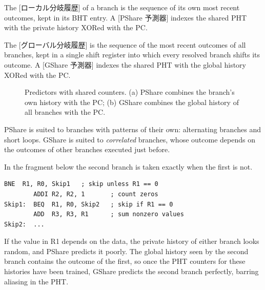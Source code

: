 \documentclass[../main.tex]{subfiles}
\begin{document}
\begin{definition}[PShare]
  The [ローカル分岐履歴] of a branch is the
  sequence of its own most recent outcomes, kept in its BHT entry.  A
  [PShare 予測器] indexes the shared PHT with the
  private history XORed with the PC.
\end{definition}

\begin{definition}[GShare]
  The [グローバル分岐履歴] is the sequence of the
  most recent outcomes of all branches, kept in a single shift register into
  which every resolved branch shifts its outcome.  A [GShare 予測器] indexes the shared PHT with the global history
  XORed with the PC.
\end{definition}

\begin{figure}[htbp]
  \centering
  
  \caption{Predictors with shared counters.  (a) PShare combines the
    branch's own history with the PC; (b) GShare combines the global history
    of all branches with the PC.}
  \label{fig:l04-pshare-gshare}
\end{figure}

PShare is suited to branches with patterns of their own: alternating
branches and short loops.  GShare is suited to \emph{correlated} branches,
whose outcome depends on the outcomes of other branches executed just before.

\begin{example}
  In the fragment below the second branch is taken exactly when the first is
  not.
  \begin{lstlisting}[language={[x86masm]Assembler}, numbers=none]
        BNE  R1, R0, Skip1   ; skip unless R1 == 0
        ADDI R2, R2, 1       ; count zeros
Skip1:  BEQ  R1, R0, Skip2   ; skip if R1 == 0
        ADD  R3, R3, R1      ; sum nonzero values
Skip2:  ...
\end{lstlisting}
  If the value in R1 depends on the data, the private history of either
  branch looks random, and PShare predicts it poorly.  The global history
  seen by the second branch contains the outcome of the first, so once the
  PHT counters for these histories have been trained, GShare predicts the
  second branch perfectly, barring aliasing in the PHT.
\end{example}
\end{document}
